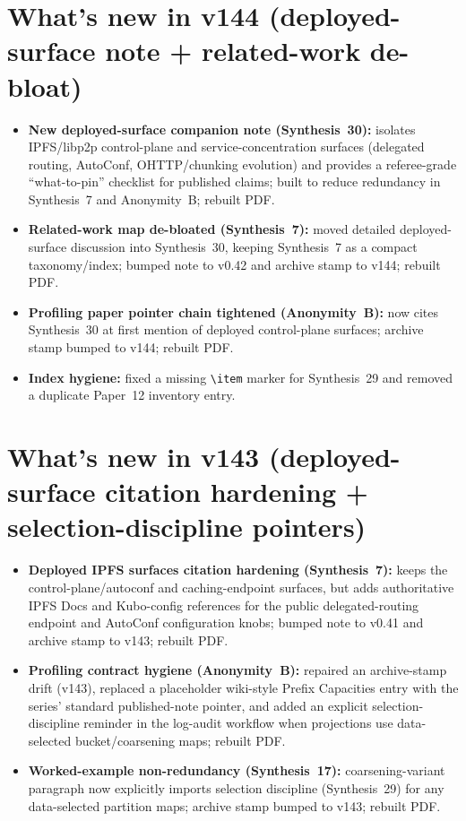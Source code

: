 \documentclass[11pt]{article}
\begin{document}
\section{What's new in v144 (deployed-surface note + related-work de-bloat)}
\begin{itemize}[leftmargin=*]
\item \textbf{New deployed-surface companion note (Synthesis~30):} isolates IPFS/libp2p control-plane and service-concentration surfaces (delegated routing, AutoConf, OHTTP/chunking evolution) and provides a referee-grade ``what-to-pin'' checklist for published claims; built to reduce redundancy in Synthesis~7 and Anonymity~B; rebuilt PDF.
\item \textbf{Related-work map de-bloated (Synthesis~7):} moved detailed deployed-surface discussion into Synthesis~30, keeping Synthesis~7 as a compact taxonomy/index; bumped note to v0.42 and archive stamp to v144; rebuilt PDF.
\item \textbf{Profiling paper pointer chain tightened (Anonymity~B):} now cites Synthesis~30 at first mention of deployed control-plane surfaces; archive stamp bumped to v144; rebuilt PDF.
\item \textbf{Index hygiene:} fixed a missing \texttt{\textbackslash item} marker for Synthesis~29 and removed a duplicate Paper~12 inventory entry.
\end{itemize}

\section{What's new in v143 (deployed-surface citation hardening + selection-discipline pointers)}
\begin{itemize}[leftmargin=*]
\item \textbf{Deployed IPFS surfaces citation hardening (Synthesis~7):} keeps the control-plane/autoconf and caching-endpoint surfaces, but adds authoritative IPFS Docs and Kubo-config references for the public delegated-routing endpoint and AutoConf configuration knobs; bumped note to v0.41 and archive stamp to v143; rebuilt PDF.
\item \textbf{Profiling contract hygiene (Anonymity~B):} repaired an archive-stamp drift (v143), replaced a placeholder wiki-style Prefix Capacities entry with the series' standard published-note pointer, and added an explicit selection-discipline reminder in the log-audit workflow when projections use data-selected bucket/coarsening maps; rebuilt PDF.
\item \textbf{Worked-example non-redundancy (Synthesis~17):} coarsening-variant paragraph now explicitly imports selection discipline (Synthesis~29) for any data-selected partition maps; archive stamp bumped to v143; rebuilt PDF.
\end{itemize}
\end{document}
